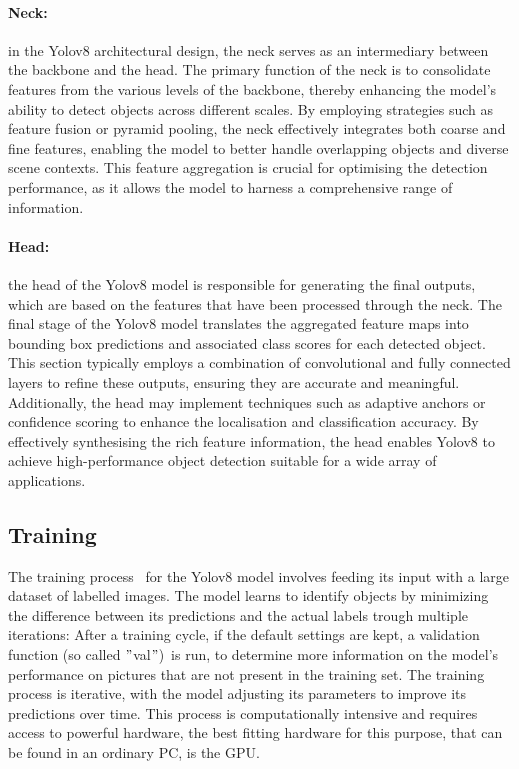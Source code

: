 \paragraph{Neck:}\label{par:neck}
in the Yolov8 architectural design, the neck serves as an intermediary between the backbone and the head.
The primary function of the neck is to consolidate features from the various levels of the backbone,
thereby enhancing the model's ability to detect objects across different scales.
By employing strategies such as feature fusion or pyramid pooling,
the neck effectively integrates both coarse and fine features,
enabling the model to better handle overlapping objects and diverse scene contexts.
This feature aggregation is crucial for optimising the detection performance,
as it allows the model to harness a comprehensive range of information.

\newpage
\paragraph{Head:}\label{par:head}
the head of the Yolov8 model is responsible for generating the final outputs,
which are based on the features that have been processed through the neck.
The final stage of the Yolov8 model translates the aggregated feature maps into bounding box predictions and associated class scores for each detected object.
This section typically employs a combination of convolutional and fully connected layers to refine these outputs,
ensuring they are accurate and meaningful.
Additionally, the head may implement techniques such as adaptive anchors or
confidence scoring to enhance the localisation and classification accuracy.
By effectively synthesising the rich feature information, the head enables Yolov8 to achieve high-performance object detection suitable for a wide array of applications.

\subsection{Training}\label{subsec:training}
The training process~\cite{redmon2016lookonceunifiedrealtime} for the Yolov8 model involves feeding its input with a large dataset of labelled images.
The model learns to identify objects by minimizing the difference between its predictions and the actual labels trough multiple iterations:
After a training cycle, if the default settings are kept, a validation function (so called \("\)val\("\))\ is run,
to determine more information on the model's performance on pictures that are not present in the training set.
The training process is iterative, with the model adjusting its parameters to improve its predictions over time.
This process is computationally intensive and requires access to powerful hardware,
the best fitting hardware for this purpose, that can be found in an ordinary PC, is the GPU\@.

